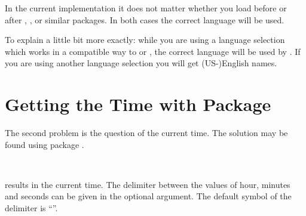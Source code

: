 In the current implementation it does not matter whether you load
 before or after
,
,
 or similar packages. In both cases the
correct language will be used.

\begin{Explain}
  To explain a little bit more exactly: while you are using a language
  selection which works in a compatible way to
   or
  , the correct language will be used
  by . If you are using another language selection you will
  get (US-)English names.
\end{Explain}


\section{Getting the Time with Package}
\label{sec:datetime.scrtime}

The second problem is the question of the current time. The solution
may be found using package .

\begin{Declaration}%
  \\
\end{Declaration}%
%
 results in the current time. The
delimiter between the values of hour, minutes and seconds can be given
in the optional argument. The default symbol of the delimiter is
``\PValue{:}''.

